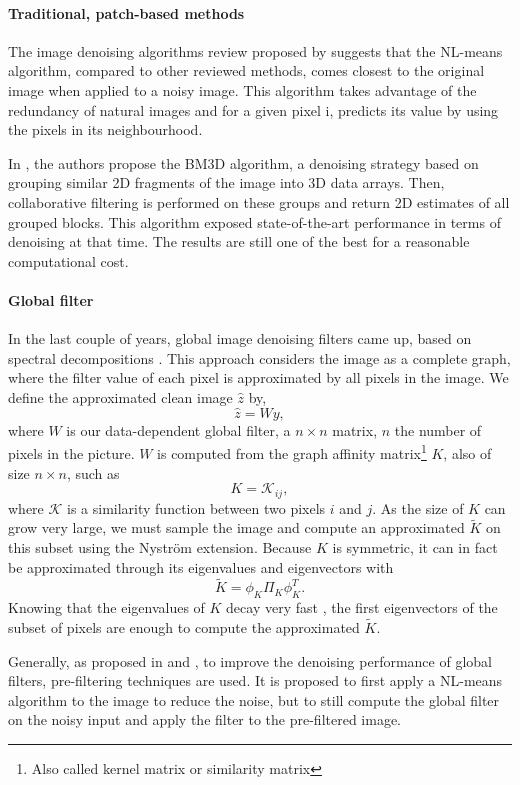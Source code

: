 \paragraph{Traditional, patch-based methods}
The image denoising algorithms review proposed by \cite{buades_review_2005} suggests that the NL-means algorithm, compared to other reviewed methods, comes closest to the original image when applied to a noisy image.
This algorithm takes advantage of the redundancy of natural images and for a given pixel i, predicts its value by using the pixels in its neighbourhood.

In \cite{dabov_image_2007}, the authors propose the BM3D algorithm, a denoising strategy based on grouping similar 2D fragments of the image into 3D data arrays. Then, collaborative filtering is performed on these groups and return 2D estimates of all grouped blocks.
This algorithm exposed state-of-the-art performance in terms of denoising at that time.
The results are still one of the best for a reasonable computational cost.

\paragraph{Global filter}
In the last couple of years, global image denoising filters came up, based on spectral decompositions \cite{glide_2014}.
This approach considers the image as a complete graph, where the filter value of each pixel is approximated by all pixels in the image.
We define the approximated clean image \(\hat{z}\) by,
\[\hat{z} = Wy,\]
where \(W\) is our data-dependent global filter, a \(n \times n\) matrix, \(n\) the number of pixels in the picture.
\(W\) is computed from the graph affinity matrix\footnote{Also called kernel matrix or similarity matrix} \(K\), also of size \(n \times n\), such as
\[K = {\mathcal{K}_{ij}},\]
where \(\mathcal{K}\) is a similarity function between two pixels \(i\) and \(j\).
As the size of \(K\) can grow very large, we must sample the image and compute an approximated \(\tilde{K}\) on this subset using the Nystr\"om extension.
Because \(K\) is symmetric, it can in fact be approximated through its eigenvalues and eigenvectors with
\[\tilde{K} = \phi_K \Pi_K \phi_K^T.\]
Knowing that the eigenvalues of \(K\) decay very fast \cite{siam_slides_2016}, the first eigenvectors of the subset of pixels are enough to compute the approximated \(\tilde{K}\).

Generally, as proposed in \cite{glide_2014} and \cite{talebi_asymptotic_2016}, to improve the denoising performance of global filters, pre-filtering techniques are used.
It is proposed to first apply a NL-means algorithm to the image to reduce the noise, but to still compute the global filter on the noisy input and apply the filter to the pre-filtered image.

